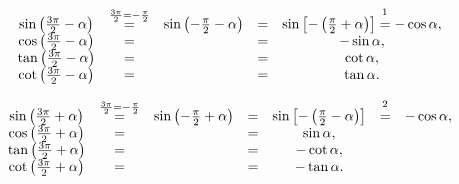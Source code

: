 \begin{definition}
    \begin{equation*}
        \begin{matrix}
            \sin\left(\frac{3\pi}{2}-\alpha\right)&\overset{\frac{3\pi}{2}=-\frac{\pi}{2}}{=}& \sin\left(-\frac{\pi}{2}-\alpha\right)&=&\sin\left[-\left(\frac{\pi}{2}+\alpha\right)\right]\overset{\footnotemark}{=}-\cos\alpha,\\
            \cos\left(\frac{3\pi}{2}-\alpha\right)&=&&=&-\sin\alpha,\\
            \tan\left(\frac{3\pi}{2}-\alpha\right)&=& &=&\cot\alpha,\\
            \cot\left(\frac{3\pi}{2}-\alpha\right)&=&&=&\tan\alpha.
        \end{matrix}
    \end{equation*}
\end{definition}

\begin{definition}
    \begin{equation*}
        \begin{matrix}
            \sin\left(\frac{3\pi}{2}+\alpha\right)&\overset{\frac{3\pi}{2}=-\frac{\pi}{2}}{=}& \sin\left(-\frac{\pi}{2}+\alpha\right)&=&\sin\left[-\left(\frac{\pi}{2}-\alpha\right)\right]&\overset{\footnotemark}{=}&-\cos\alpha,\\
            \cos\left(\frac{3\pi}{2}+\alpha\right)&=&&=&\sin\alpha,\\
            \tan\left(\frac{3\pi}{2}+\alpha\right)&=& &=&-\cot\alpha,\\
            \cot\left(\frac{3\pi}{2}+\alpha\right)&=&&=&-\tan\alpha.
        \end{matrix}
    \end{equation*}
\end{definition}

